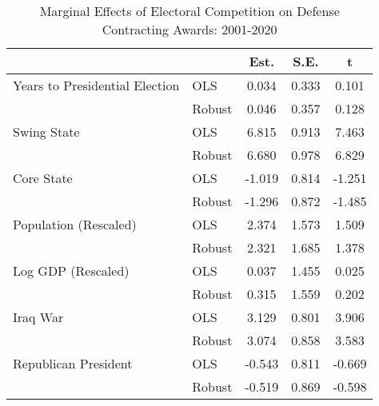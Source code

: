\begin{table}

\caption{Marginal Effects of Electoral Competition on Defense Contracting Awards: 2001-2020}
\centering
\begin{tabular}[t]{llccc}
\toprule
  &    & Est. & S.E. & t\\
\midrule
Years to Presidential
Election & OLS & 0.034 & 0.333 & 0.101\\
 & Robust & 0.046 & 0.357 & 0.128\\
Swing State & OLS & 6.815 & 0.913 & 7.463\\
 & Robust & 6.680 & 0.978 & 6.829\\
Core State & OLS & -1.019 & 0.814 & -1.251\\
 & Robust & -1.296 & 0.872 & -1.485\\
Population (Rescaled) & OLS & 2.374 & 1.573 & 1.509\\
 & Robust & 2.321 & 1.685 & 1.378\\
Log GDP (Rescaled) & OLS & 0.037 & 1.455 & 0.025\\
 & Robust & 0.315 & 1.559 & 0.202\\
Iraq War & OLS & 3.129 & 0.801 & 3.906\\
 & Robust & 3.074 & 0.858 & 3.583\\
Republican President & OLS & -0.543 & 0.811 & -0.669\\
 & Robust & -0.519 & 0.869 & -0.598\\
\bottomrule
\end{tabular}
\label{tab:state-res}
\end{table}
